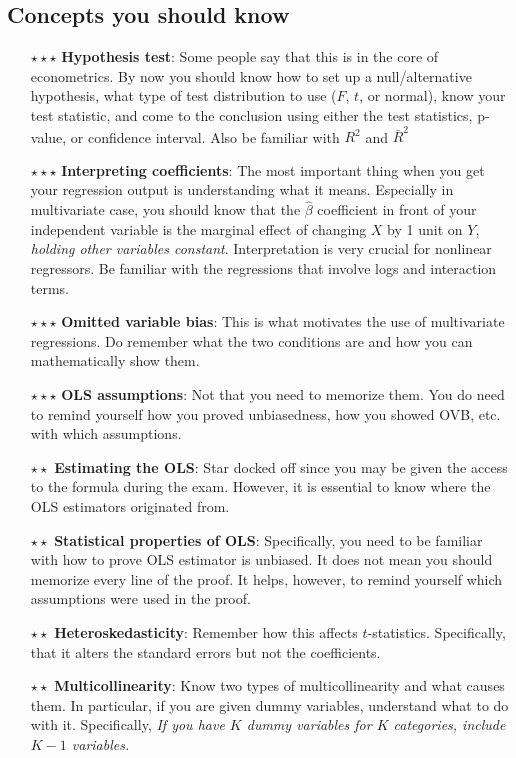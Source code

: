 \documentclass[12pt]{article}
\theoremstyle{definition}
\theoremstyle{property}
\theoremstyle{assumption}
\theoremstyle{example}
\theoremstyle{comment}
\begin{document}
\subsection{Concepts you should know}
\begin{itemize}
\item[$\star\star\star$] \textbf{Hypothesis test}: Some people say that this is in the core of econometrics. By now you should know how to set up a null/alternative hypothesis, what type of test distribution to use ($F$, $t$, or normal), know your test statistic, and come to the conclusion using either the test statistics, p-value, or confidence interval. Also be familiar with $R^2$ and $\bar{R}^2$
\item[$\star\star\star$] \textbf{Interpreting coefficients}: The most important thing when you get your regression output is understanding what it means. Especially in multivariate case, you should know that the $\hat{\beta}$ coefficient in front of your independent variable is the marginal effect of changing $X$ by 1 unit on $Y$, \textit{holding other variables constant}. Interpretation is very crucial for nonlinear regressors. Be familiar with the regressions that involve logs and interaction terms. 
\item[$\star\star\star$]\textbf{Omitted variable bias}: This is what motivates the use of multivariate regressions. Do remember what the two conditions are and how you can mathematically show them.
\item[$\star\star\star$] \textbf{OLS assumptions}: Not that you need to memorize them. You do need to remind yourself how you proved unbiasedness, how you showed OVB, etc. with which assumptions. 
\item[$\star\star$] \textbf{Estimating the OLS}: Star docked off since you may be given the access to the formula during the exam. However, it is essential to know where the OLS estimators originated from. 
\item[$\star\star$] \textbf{Statistical properties of OLS}: Specifically, you need to be familiar with how to prove OLS estimator is unbiased. It does not mean you should memorize every line of the proof. It helps, however, to remind yourself which assumptions were used in the proof.
\item[$\star\star$]\textbf{Heteroskedasticity}: Remember how this affects $t$-statistics. Specifically, that it alters the standard errors but not the coefficients.  
\item[$\star\star$]\textbf{Multicollinearity}: Know two types of multicollinearity and what causes them. In particular, if you are given dummy variables, understand what to do with it. Specifically, \textit{If you have $K$ dummy variables for $K$ categories, include $K-1$ variables.}

\end{itemize}
\end{document}
